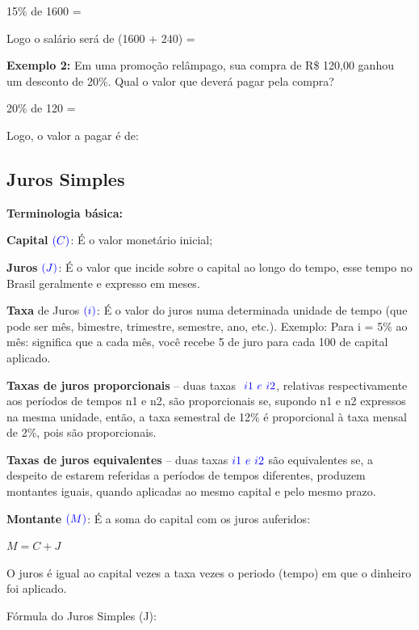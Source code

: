 \begin{multicols*}{2}
	15\% de 1600  =  

	Logo o salário será de (1600 + 240) = 

	\textbf{Exemplo 2:} Em uma promoção relâmpago, sua compra de R\$ 120,00 ganhou um desconto de 20\%. Qual o valor que deverá pagar pela compra?

	20\% de 120  =  

	Logo, o valor a pagar é de: 

	\subsection{Juros Simples}

	\textbf{Terminologia básica:}

	\textbf{Capital} $\color{blue}(C)$: É o valor monetário inicial;

	\textbf{Juros} $\color{blue}(J)$: É o valor que incide sobre o capital ao longo do tempo, esse tempo no Brasil geralmente e expresso em meses.

	\textbf{Taxa} de Juros $\color{blue}(i)$: É o valor do juros numa determinada unidade de tempo (que pode ser mês, bimestre, trimestre, semestre, ano, etc.). Exemplo: Para i = 5\% ao mês: significa que a cada mês, você recebe 5 de juro para cada 100 de capital aplicado.

	\textbf{Taxas de juros proporcionais} – duas taxas  $\color{blue} \ i1\ e \ i2$, relativas respectivamente aos períodos de tempos n1 e n2, são proporcionais se, supondo n1 e n2 expressos na mesma unidade, então, a taxa semestral de 12\% é proporcional à taxa mensal de 2\%, pois são proporcionais.

	\textbf{Taxas de juros equivalentes} – duas taxas$\color{blue} \  i1 \ e \ i2$ são equivalentes se, a despeito de estarem referidas a períodos de tempos diferentes, produzem montantes iguais, quando aplicadas ao mesmo capital e pelo mesmo prazo.

	\textbf{Montante} $\color{blue}(M)$: É a soma do capital com os juros auferidos:

	\textbf{\color{blue}$M = C + J$}

	O juros é igual ao capital vezes a taxa vezes o periodo (tempo) em que o dinheiro foi aplicado.

	Fórmula do Juros Simples (J):

	\textbf{}


\end{multicols*}
